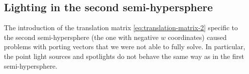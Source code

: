 \subsection{Lighting in the second semi-hypersphere}
The introduction of the translation matrix \ref{eq:translation-matrix-2} specific to the second semi-hypersphere (the one with negative $w$ coordinates) caused problems with porting vectors that we were not able to fully solve.
In particular, the point light sources and spotlights do not behave the same way as in the first semi-hypersphere.